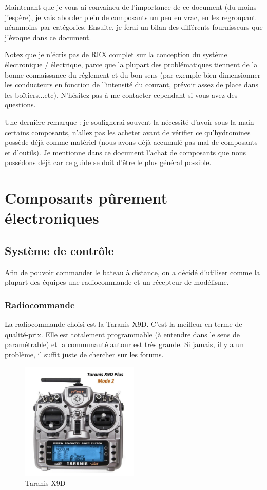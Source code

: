 \documentclass[a4paper, 11pt]{report}
\begin{document}
Maintenant que je vous ai convaincu de l'importance de ce document
(du moins j'espère), je vais aborder plein de composants un peu en
vrac, en les regroupant néanmoins par catégories. Ensuite, je ferai
un bilan des différents fournisseurs que j'évoque dans ce document.

Notez que je n'écris pas de REX complet sur la conception du système
électronique / électrique, parce que la plupart des problématiques
tiennent de la bonne connaissance du réglement et du bon sens (par
exemple bien dimensionner les conducteurs en fonction de l'intensité
du courant, prévoir assez de place dans les boîtiers...etc). N'hésitez
pas à me contacter cependant si vous avez des questions.

Une dernière remarque : je soulignerai souvent la nécessité d'avoir
sous la main certains composants, n'allez pas les acheter avant de
vérifier ce qu'hydromines possède déjà comme matériel (nous avons
déjà accumulé pas mal de composants et d'outils). Je mentionne dans
ce document l'achat de composants que nous possédons déjà car ce guide
se doit d'être le plus général possible.

\chapter{Composants pûrement électroniques}

\section{Système de contrôle}
Afin de pouvoir commander le bateau à distance, on a décidé d'utiliser comme la plupart des équipes une radiocommande et un récepteur de modélisme.

\subsection{Radiocommande}
La radiocommande choisi est la Taranis X9D. C'est la meilleur en terme de qualité-prix. Elle est totalement programmable (à entendre dans le sens de paramétrable) et la communauté autour est très grande. Si jamais, il y a un problème, il suffit juste de chercher sur les forums.

\begin{figure}[h]
	\begin{center}
		\includegraphics[width=0.5\textwidth]{images/taranis.jpg}
		\caption{Taranis X9D}
	\end{center}
\end{figure}
\end{document}
